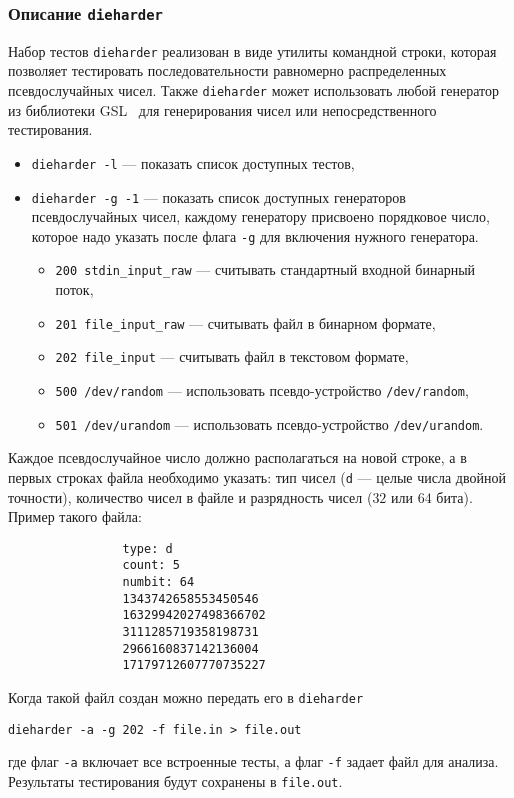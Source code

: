 \documentclass[%
floatfix,
showkeys,
nofootinbib, %
superscriptaddress, %
]{revtex4-1}
\begin{document}
\subsubsection{Описание \texttt{dieharder}}
Набор тестов \texttt{dieharder} реализован в виде утилиты командной
строки, которая позволяет тестировать последовательности равномерно
распределенных псевдослучайных чисел. Также \texttt{dieharder} может
использовать любой генератор из библиотеки GSL~\cite{L_GSL:2015} для
генерирования чисел или непосредственного тестирования.
\begin{itemize}
        \item \verb|dieharder -l| --- показать список доступных тестов,
        \item \verb|dieharder -g -1| --- показать список доступных генераторов псевдослучайных чисел, каждому генератору присвоено порядковое число, которое надо указать после флага \verb|-g| для включения нужного генератора.   
        \begin{itemize}
                \item \verb|200 stdin_input_raw| --- считывать стандартный входной бинарный поток,
                \item \verb|201 file_input_raw| --- считывать файл в бинарном формате,
                \item \verb|202 file_input| --- считывать файл в текстовом формате,
                \item \verb|500 /dev/random| --- использовать псевдо-устройство \texttt{/dev/random},
                \item \verb|501 /dev/urandom| --- использовать псевдо-устройство \texttt{/dev/urandom}.
        \end{itemize}
\end{itemize}
Каждое псевдослучайное число должно располагаться на новой строке, а в
первых строках файла необходимо указать: тип чисел (\verb|d| --- целые
числа двойной точности), количество чисел в файле и разрядность чисел
($32$ или $64$ бита). Пример такого файла:
\begin{verbatim}
                type: d
                count: 5
                numbit: 64
                1343742658553450546
                16329942027498366702
                3111285719358198731
                2966160837142136004
                17179712607770735227
\end{verbatim}
Когда такой файл создан можно передать его в \verb|dieharder|
\begin{verbatim}
dieharder -a -g 202 -f file.in > file.out
\end{verbatim}
где флаг \verb|-a| включает все встроенные тесты, а флаг \verb|-f| задает файл для анализа. Результаты тестирования будут сохранены в \verb|file.out|.
\end{document}
